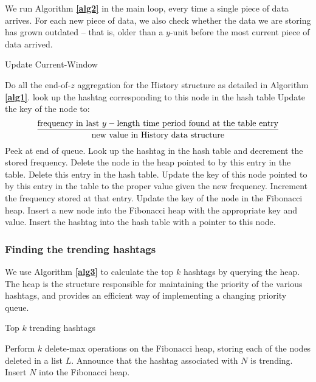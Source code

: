 \documentclass[twoside]{article}
\newcommand{\aref}[1]
 {\textbf{\autoref{#1}}}
\begin{document}
{We run Algorithm \aref{alg2} in the main loop, every time a single piece of data arrives.
For each new piece of data, we also check whether the data we are storing has grown 
outdated -- that is, older than a $y$-unit before the most current piece of data arrived.

\begin{algorithm} 
\caption{Update Current-Window} \label{alg2}
\begin{algorithmic}[1]
		\State Do all the end-of-$z$ aggregation for the History structure as detailed in 
		Algorithm \aref{alg1}.
			\State look up the hashtag corresponding to this node in the hash table
			\State Update the key of the node to: \[\frac{\textnormal{frequency in last } y-\textnormal{length time period found at the table entry}}{\textnormal{new value in History data structure}}\]
		\EndFor
	\EndIf
		\State Peek at end of queue.
			\State Look up the hashtag in the hash table and decrement the stored frequency.
				\State Delete the node in the heap pointed to by this entry in the table.
				\State Delete this entry in the hash table.
			\Else	
				\State Update the key of this node pointed to by this entry in the table to the proper value given the new frequency.
			\EndIf
		\EndIf
	\EndIf
		\State Increment the frequency stored at that entry.
		\State Update the key of the node in the Fibonacci heap.
	\Else
		\State Insert a new node into the Fibonacci heap with the appropriate key and value. 
		\State Insert the hashtag into the hash table with a pointer to this node.
 	\EndIf
\EndWhile
\end{algorithmic}
\end{algorithm}

\subsubsection{Finding the trending hashtags}

We use Algorithm \aref{alg3} to calculate the top $k$ hashtags by querying the heap. The heap is the structure responsible for maintaining the priority of the various hashtags, and provides an efficient way of implementing a changing priority queue.

\begin{algorithm} 
\caption{Top $k$ trending hashtags} \label{alg3}
\begin{algorithmic}[1]
\State Perform $k$ delete-max operations on the Fibonacci heap, storing each of the nodes deleted in a list $L$.
	\State Announce that the hashtag associated with $N$ is trending.
	\State Insert $N$ into the Fibonacci heap.
\EndFor
\end{algorithmic}
\end{algorithm}


}
\end{document}
